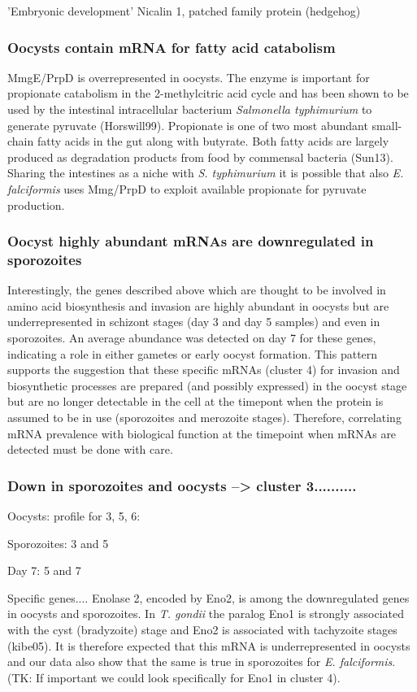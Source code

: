 \documentclass{bmcart}
\begin{document}
'Embryonic development' Nicalin 1, patched family protein (hedgehog)


\subsubsection*{Oocysts contain mRNA for fatty acid catabolism}
MmgE/PrpD is overrepresented in oocysts. The enzyme is important for
propionate catabolism in the 2-methylcitric acid cycle and has been
shown to be used by the intestinal intracellular bacterium
\textit{Salmonella typhimurium} to generate pyruvate (Horswill99).
Propionate is one of two most abundant small-chain fatty acids in the
gut along with butyrate. Both fatty acids are largely produced as
degradation products from food by commensal bacteria (Sun13). Sharing
the intestines as a niche with \textit{S. typhimurium} it is possible
that also \textit{E. falciformis} uses Mmg/PrpD to exploit available
propionate for pyruvate production.

\subsubsection*{Oocyst highly abundant mRNAs are downregulated in sporozoites}
Interestingly, the genes described above which are thought to be
involved in amino acid biosynthesis and invasion are highly abundant
in oocysts but are underrepresented in schizont stages (day 3 and day
5 samples) and even in sporozoites. An average abundance was detected
on day 7 for these genes, indicating a role in either gametes or early
oocyst formation.  This pattern supports the suggestion that these
specific mRNAs (cluster 4) for invasion and biosynthetic processes are
prepared (and possibly expressed) in the oocyst stage but are no
longer detectable in the cell at the timepont when the protein is
assumed to be in use (sporozoites and merozoite stages).  Therefore,
correlating mRNA prevalence with biological function at the timepoint
when mRNAs are detected must be done with care.

\subsubsection*{Down in sporozoites and oocysts -->  cluster 3..........}
Oocysts: profile for 3, 5, 6:

Sporozoites: 3 and 5

Day 7: 5 and 7

Specific genes....  Enolase 2, encoded by Eno2, is among the
downregulated genes in oocysts and sporozoites.  In \textit{T. gondii}
the paralog Eno1 is strongly associated with the cyst (bradyzoite)
stage and Eno2 is associated with tachyzoite stages (kibe05). It is
therefore expected that this mRNA is underrepresented in oocysts and
our data also show that the same is true in sporozoites for
\textit{E. falciformis}. (TK: If important we could look specifically
for Eno1 in cluster 4).
\end{document}
